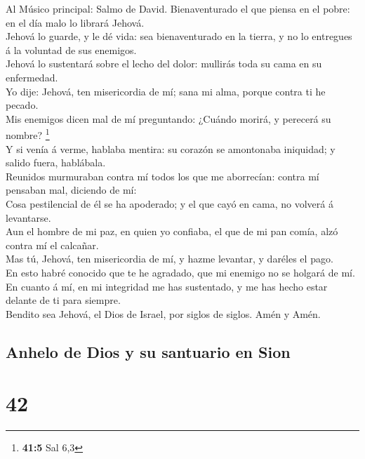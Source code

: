  Al Músico principal: Salmo de David. Bienaventurado el
que piensa en el pobre: en el día malo lo librará Jehová.\\
 Jehová lo guarde, y le dé vida: sea bienaventurado en la
tierra, y no lo entregues á la voluntad de sus enemigos.\\
 Jehová lo sustentará sobre el lecho del dolor: mullirás
toda su cama en su enfermedad.\\
 Yo dije: Jehová, ten misericordia de mí; sana mi alma,
porque contra ti he pecado.\\
 Mis enemigos dicen mal de mí preguntando: ¿Cuándo morirá,
y perecerá su nombre? \footnote{\textbf{41:5} Sal 6,3}\\
 Y si venía á verme, hablaba mentira: su corazón se
amontonaba iniquidad; y salido fuera, hablábala.\\
 Reunidos murmuraban contra mí todos los que me
aborrecían: contra mí pensaban mal, diciendo de mí:\\
 Cosa pestilencial de él se ha apoderado; y el que cayó en
cama, no volverá á levantarse.\\
 Aun el hombre de mi paz, en quien yo confiaba, el que de
mi pan comía, alzó contra mí el calcañar.\\
 Mas tú, Jehová, ten misericordia de mí, y hazme
levantar, y daréles el pago.\\
 En esto habré conocido que te he agradado, que mi
enemigo no se holgará de mí.\\
 En cuanto á mí, en mi integridad me has sustentado, y me
has hecho estar delante de ti para siempre.\\
 Bendito sea Jehová, el Dios de Israel, por siglos de
siglos. Amén y Amén.

\hypertarget{anhelo-de-dios-y-su-santuario-en-sion}{%
\subsection{Anhelo de Dios y su santuario en
Sion}\label{anhelo-de-dios-y-su-santuario-en-sion}}

\hypertarget{section-41}{%
\section{42}\label{section-41}}

